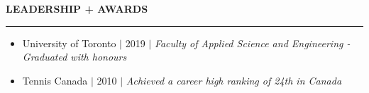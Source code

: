 \documentclass[12pt]{article}
\newcommand{\sectionRule}{\textcolor{gray}{\rule{7.27in}{0.02cm}}}
\newcommand{\sectionTxt}[1]{\noindent\textbf{#1}\\}
\newcommand{\textDate}[3]{\noindent#1 $|$ #2 $|$ {\color{textGray} #3}}
\begin{document}
    \sectionTxt{LEADERSHIP + AWARDS}
    \sectionRule

    \begin{small}
        \begin{itemize}
            \itemsep0em
            \item {\color{textGray} \textDate{University of Toronto}{2019}{\textit{Faculty of Applied Science and Engineering - Graduated with honours}}}
            \item {\color{textGray} \textDate{Tennis Canada}{2010}{\textit{Achieved a career high ranking of 24th in Canada}}}
        \end{itemize}
    \end{small}
\end{document}
